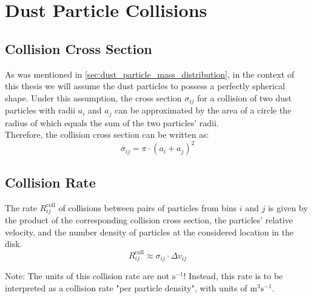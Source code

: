 
\clearpage\section{Dust Particle Collisions}


    \subsection{Collision Cross Section}
        
        As was mentioned in \cref{sec:dust_particle_mass_distribution}, in the context of 
        this thesis we will assume the dust particles to possess a perfectly spherical shape. 
        Under this assumption, the cross section $\sigma_{ij}$ for a collision of two dust 
        particles with radii $a_i$ and $a_j$ can be approximated by the area of a circle the 
        radius of which equals the sum of the two particles' radii. \\

        Therefore, the collision cross section can be written as:
        \begin{equation}
            \sigma_{ij} = \pi \cdot (a_i+a_j)^2
        \end{equation}

    \subsection{Collision Rate}

        The rate $R^\text{coll}_{ij}$ of collisions between pairs of particles from bins $i$ 
        and $j$ is given by the product of the corresponding collision cross section, the
        particles' relative velocity, and the number density of particles at the considered 
        location in the disk. 
        \begin{equation}                                            %
            R^\text{coll}_{ij}
                \approx \sigma_{ij} \cdot \Delta v_{ij}
        \end{equation}

        Note: The units of this collision rate are not $\text{s}^{-1}$! Instead, this rate is 
        to be interpreted as a collision rate "per particle density", with units of 
        $\text{m}^{3} \text{s}^{-1}$.

